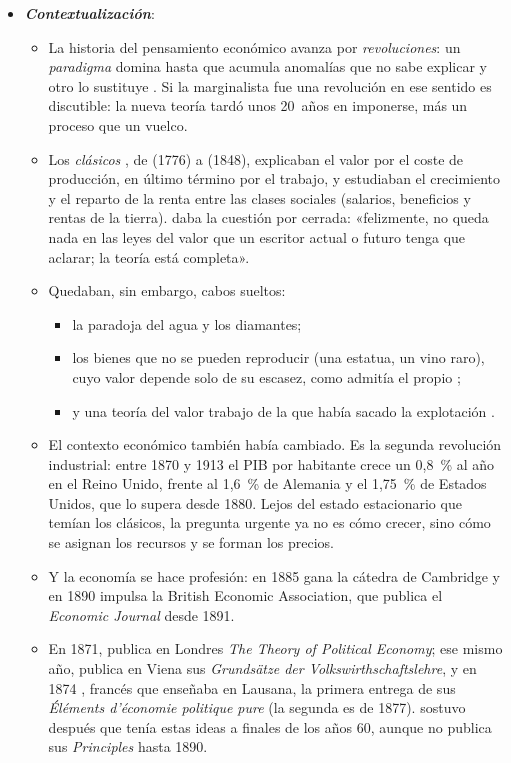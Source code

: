 \documentclass[11pt]{article}
\begin{document}
\begin{itemize}
\item \textbf{\emph{Contextualización}}:
  \begin{itemize}
  \item La historia del pensamiento económico avanza por \emph{revoluciones}: un \emph{paradigma} domina hasta que acumula anomalías que no sabe explicar y otro lo sustituye\nocite{Kuhn1962Structure} . Si la marginalista fue una revolución en ese sentido es discutible: la nueva teoría tardó unos 20~años en imponerse, más un proceso que un vuelco\nocite{Blaug1972Marginal}.
  \item Los \emph{clásicos} , de  (1776) a  (1848), explicaban el valor por el coste de producción, en último término por el trabajo, y estudiaban el crecimiento y el reparto de la renta entre las clases sociales (salarios, beneficios y rentas de la tierra).  daba la cuestión por cerrada: «felizmente, no queda nada en las leyes del valor que un escritor actual o futuro tenga que aclarar; la teoría está completa»\nocite{Mill1848Principles}.
  \item Quedaban, sin embargo, cabos sueltos:
    \begin{itemize}
    \item la paradoja del agua y los diamantes;
    \item los bienes que no se pueden reproducir (una estatua, un vino raro), cuyo valor depende solo de su escasez, como admitía el propio \textcite[cap.~I, secc.~I]{Ricardo1817Principles};
    \item y una teoría del valor trabajo de la que  había sacado la explotación .
    \end{itemize}
  \item El contexto económico también había cambiado. Es la segunda revolución industrial: entre 1870 y 1913 el PIB por habitante crece un 0,8~\% al año en el Reino Unido, frente al 1,6~\% de Alemania y el 1,75~\% de Estados Unidos, que lo supera desde 1880\nocite{GGDC2024Maddison}. Lejos del estado estacionario que temían los clásicos, la pregunta urgente ya no es cómo crecer, sino cómo se asignan los recursos y se forman los precios.
  \item Y la economía se hace profesión: en 1885  gana la cátedra de Cambridge y en 1890 impulsa la British Economic Association, que publica el \emph{Economic Journal} desde 1891\nocite{HET2026Marshall,HET2026RES}.
  \item En 1871,  publica en Londres \emph{The Theory of Political Economy}\nocite{Jevons1871Theory}; ese mismo año,  publica en Viena sus \emph{Grundsätze der Volkswirthschaftslehre}\nocite{Menger1871Grundsatze}, y en 1874 , francés que enseñaba en Lausana, la primera entrega de sus \emph{Éléments d'économie politique pure} (la segunda es de 1877)\nocite{Walras1874Elements}.  sostuvo después que tenía estas ideas a finales de los años 60, aunque no publica sus \emph{Principles} hasta 1890\nocite{Marshall1890Principles,HET2026Marshall}.

\end{itemize}
\end{itemize}
\end{document}

